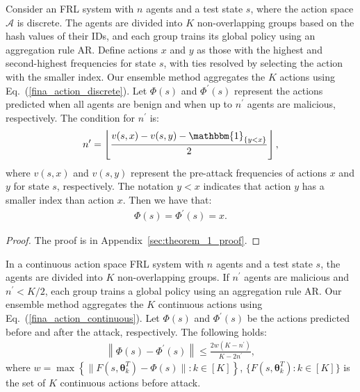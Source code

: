 \begin{thm}
\label{theorem_1}

%
Consider an FRL system with \(n\) agents and a test state \(s\), where the action space \(\mathcal{A}\) is discrete. The agents are divided into \(K\) non-overlapping groups based on the hash values of their IDs, and each group trains its global policy using an aggregation rule \(\text{AR}\). 
%
Define actions \(x\) and \(y\) as those with the highest and second-highest frequencies for state \(s\), with ties resolved by selecting the action with the smaller index. Our ensemble method aggregates the \(K\) actions using Eq.~(\ref{fina_action_discrete}).
%
Let \(\Phi(s)\) and \(\Phi^{\prime}(s)\) represent the actions predicted when all agents are benign and when up to \(n^{\prime}\) agents are malicious, respectively. The condition for \(n^{\prime}\) is:
\begin{align}
n^{\prime} = \left\lfloor \frac{v(s,x)-v(s,y) - \mathbbm{1}_{\{ y<x \}}}{2} \right\rfloor, 
\end{align}
%
where \(v(s, x)\) and \(v(s, y)\) represent the pre-attack frequencies of actions \(x\) and \(y\) for state \(s\), respectively. The notation \(y < x\) indicates that action \(y\) has a smaller index than action \(x\).
%
Then we have that:
\begin{align}
\Phi(s) = \Phi^{\prime}(s) = x.
\end{align}
\end{thm}

\begin{proof}
The proof is in Appendix~\ref{sec:theorem_1_proof}.
\end{proof}




\begin{thm}
\label{theorem_2}
%
%
In a continuous action space FRL system with \(n\) agents and a test state \(s\), the agents are divided into \(K\) non-overlapping groups. If \(n^{\prime}\) agents are malicious and \(n^{\prime} < K/2\), each group trains a global policy using an aggregation rule \(\text{AR}\). Our ensemble method aggregates the \(K\) continuous actions using Eq.~(\ref{fina_action_continuous}). Let \(\Phi(s)\) and \(\Phi^{\prime}(s)\) be the actions predicted before and after the attack, respectively. The following holds:
\begin{align}
 \left\| \Phi(s)  - \Phi^{\prime}(s)  \right\|  \leq \frac{2  w(K-n^{\prime})}{K-2n^{\prime}},
\end{align}
where $w=\max \left\{ \| F(s, \bm{\theta}_k^T) - \Phi(s) \|  : k \in [K] \right\}$, $\{F(s, \bm{\theta}_k^T): k \in [K]\}$ is the set of $K$ continuous actions before attack.
\end{thm}

